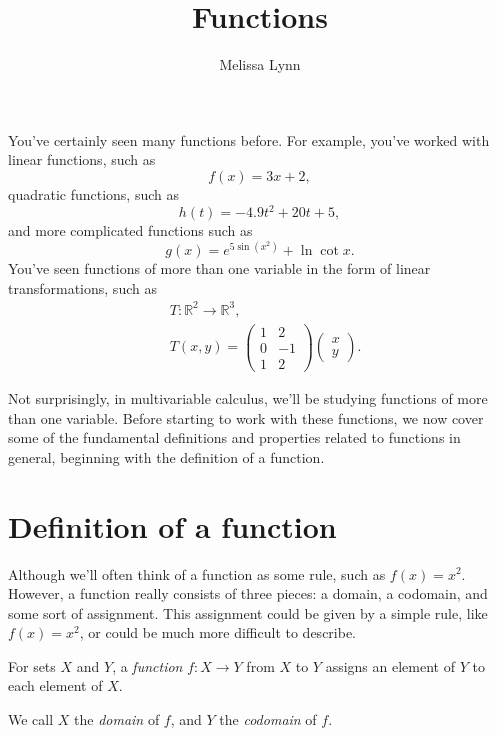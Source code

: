 \documentclass{ximera}
\title{Functions}
\author{Melissa Lynn}
\begin{document}
\begin{abstract}
\end{abstract}
\maketitle

You've certainly seen many functions before. For example, you've worked with linear functions, such as
\[
f(x) = 3x+2,
\]
quadratic functions, such as
\[
h(t) = -4.9t^2 + 20t + 5,
\]
and more complicated functions such as
\[
g(x) = e^{5\sin(x^2)}+\ln \cot x.
\]
You've seen functions of more than one variable in the form of linear transformations, such as
\begin{align*}
&T:\mathbb{R}^2\rightarrow\mathbb{R}^3,\\
&T(x,y) = \left(\begin{array}{cc}
1 & 2\\
0 & -1\\
1 & 2
\end{array}\right)
\left(\begin{array}{c}
x\\
y
\end{array}\right).
\end{align*}

Not surprisingly, in multivariable calculus, we'll be studying functions of more than one variable. Before starting to work with these functions, we now cover some of the fundamental definitions and properties related to functions in general, beginning with the definition of a function.

\section*{Definition of a function}

Although we'll often think of a function as some rule, such as $f(x) = x^2$. However, a function really consists of three pieces: a domain, a codomain, and some sort of assignment. This assignment could be given by a simple rule, like $f(x) = x^2$, or could be much more difficult to describe.

\begin{definition}
For sets $X$ and $Y$, a \emph{function} $f:X\rightarrow Y$ from $X$ to $Y$ assigns an element of $Y$ to each element of $X$.

We call $X$ the \emph{domain} of $f$, and $Y$ the \emph{codomain} of $f$.
\end{definition}
\end{document}
